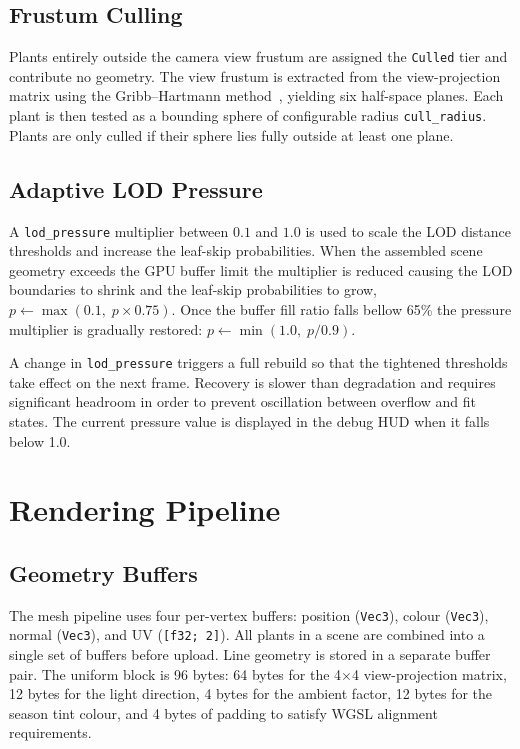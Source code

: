 \subsection{Frustum Culling}

Plants entirely outside the camera view frustum are assigned the \texttt{Culled} tier and contribute no
geometry. The view frustum is extracted from the view-projection matrix using the Gribb--Hartmann
method~\cite{gribbFastExtractionViewing}, yielding six half-space planes. Each plant is then tested as a
bounding sphere of configurable radius \texttt{cull\_radius}. Plants are only culled if their sphere lies
fully outside at least one plane.

\subsection{Adaptive LOD Pressure}

A \texttt{lod\_pressure} multiplier between $0.1$ and $1.0$ is used to scale the LOD distance thresholds and
increase the leaf-skip probabilities. When the assembled scene geometry exceeds the GPU buffer limit the
multiplier is reduced causing the LOD boundaries to shrink and the leaf-skip probabilities to grow,
$p \leftarrow \max(0.1,\; p \times 0.75)$. Once the buffer fill ratio falls bellow 65\% the pressure multiplier
is gradually restored: $p \leftarrow \min(1.0,\; p / 0.9)$.

A change in \texttt{lod\_pressure} triggers a full rebuild so that the tightened thresholds take effect
on the next frame. Recovery is slower than degradation and requires significant headroom in order to prevent
oscillation between overflow and fit states. The current pressure value is displayed in the debug HUD when
it falls below 1.0.

\section{Rendering Pipeline}

\subsection{Geometry Buffers}

The mesh pipeline uses four per-vertex buffers: position (\texttt{Vec3}), colour (\texttt{Vec3}), normal
(\texttt{Vec3}), and UV (\texttt{[f32; 2]}). All plants in a scene are combined into a single set of buffers
before upload. Line geometry is stored in a separate buffer pair. The uniform block is 96 bytes: 64 bytes
for the 4$\times$4 view-projection matrix, 12 bytes for the light direction, 4 bytes for the ambient factor,
12 bytes for the season tint colour, and 4 bytes of padding to satisfy WGSL alignment requirements.

